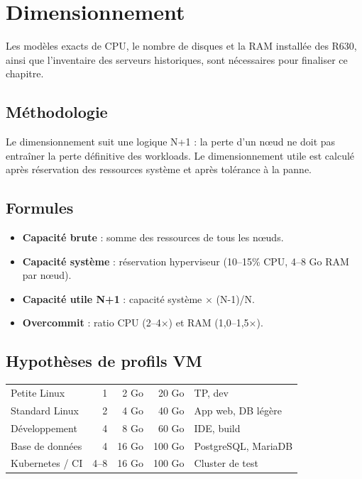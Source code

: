 \chapter{Dimensionnement}
\label{chap:dimensionnement}

\begin{todobox}
Les modèles exacts de CPU, le nombre de disques et la RAM installée des R630, ainsi que l'inventaire des serveurs historiques, sont nécessaires pour finaliser ce chapitre.
\end{todobox}

\section{Méthodologie}
Le dimensionnement suit une logique N+1 : la perte d'un nœud ne doit pas entraîner la perte définitive des workloads. Le dimensionnement utile est calculé après réservation des ressources système et après tolérance à la panne.

\section{Formules}
\begin{itemize}
  \item \textbf{Capacité brute} : somme des ressources de tous les nœuds.
  \item \textbf{Capacité système} : réservation hyperviseur (10–15\% CPU, 4–8 Go RAM par nœud).
  \item \textbf{Capacité utile N+1} : capacité système $\times$ (N-1)/N.
  \item \textbf{Overcommit} : ratio CPU (2–4$\times$) et RAM (1,0–1,5$\times$).
\end{itemize}

\section{Hypothèses de profils VM}
\begin{xltabular}{\textwidth}{@{}lrrrX@{}}
\toprule
{} &  &  &  &  \\
\midrule
\endhead
\bottomrule
\endfoot
\bottomrule
\endlastfoot
Petite Linux      & 1 & 2 Go  & 20 Go  & TP, dev \\
Standard Linux    & 2 & 4 Go  & 40 Go  & App web, DB légère \\
Développement     & 4 & 8 Go  & 60 Go  & IDE, build \\
Base de données   & 4 & 16 Go & 100 Go & PostgreSQL, MariaDB \\
Kubernetes / CI   & 4–8 & 16 Go & 100 Go & Cluster de test \\

\end{xltabular}

